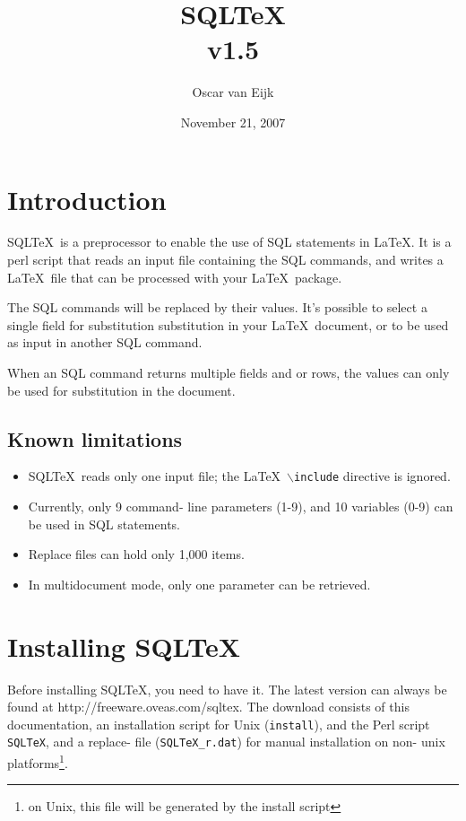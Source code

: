 \documentclass{article}
\newcommand{\bs}{\ensuremath{\backslash}}
\begin{document}
\title{SQL\TeX\\v1.5}
\date{November 21, 2007}
\author{Oscar van Eijk}

\maketitle

\hrulefill

\tableofcontents

\hrulefill

\section{Introduction}

SQL\TeX\ is a preprocessor to enable the use of SQL statements in \LaTeX. It is a perl script that reads
an input file containing the SQL commands, and writes a \LaTeX\ file that can be processed with your
\LaTeX\ package.

The SQL commands will be replaced by their values. It's possible to select a single field for substitution
substitution in your \LaTeX\ document, or to be used as input in another SQL command.

When an SQL command returns multiple fields and or rows, the values can only be used for substitution
in the document.

\subsection{Known limitations}

\begin{itemize}
\item SQL\TeX\ reads only one input file; the \LaTeX\ \texttt{\bs include} directive is ignored.
\item Currently, only 9 command- line parameters (1-9), and 10 variables (0-9) can be used in SQL
statements.
\item Replace files can hold only 1,000 items.
\item In multidocument mode, only one parameter can be retrieved.
\end{itemize}

\section{Installing SQL\TeX}

Before installing SQL\TeX, you need to have it. The latest version can always be found at
\textsf{http://freeware.oveas.com/sqltex}.
The download consists of this do\-cumentation, an installation script for Unix
(\texttt{install}), and the Perl script \texttt{SQLTeX}, and a replace- file (\texttt{SQLTeX\_r.dat}) for manual installation
on non- unix platforms\footnote{on Unix, this file will be generated by the install script}.
\end{document}
